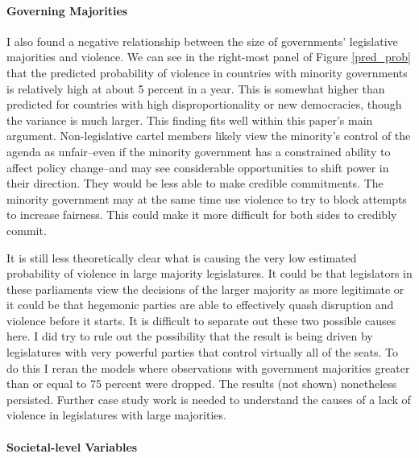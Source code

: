 \documentclass[a4paper]{article}\usepackage[]{graphicx}\usepackage[]{color}
\begin{document}
\paragraph{Governing Majorities}

I also found a negative relationship between the size of governments' legislative majorities and violence. We can see in the right-most panel of Figure \ref{pred_prob} that the predicted probability of violence in countries with minority governments is relatively high at about 5 percent in a year. This is somewhat higher than predicted for countries with high disproportionality or new democracies, though the variance is much larger. This finding fits well within this paper's main argument. Non-legislative cartel members likely view the minority's control of the agenda as unfair--even if the minority government has a constrained ability to affect policy change--and may see considerable opportunities to shift power in their direction. They would be less able to make credible commitments. The minority government may at the same time use violence to try to block attempts to increase fairness. This could make it more difficult for both sides to credibly commit.

It is still less theoretically clear what is causing the very low estimated probability of violence in large majority legislatures. It could be that legislators in these parliaments view the decisions of the larger majority as more legitimate or it could be that hegemonic parties are able to effectively quash disruption and violence before it starts. It is difficult to separate out these two possible causes here. I did try to rule out the possibility that the result is being driven by legislatures with very powerful parties that control virtually all of the seats. To do this I reran the models where observations with government majorities greater than or equal to 75 percent were dropped. The results (not shown) nonetheless persisted. Further case study work is needed to understand the causes of a lack of violence in legislatures with large majorities.

\paragraph{Societal-level Variables}
\end{document}

